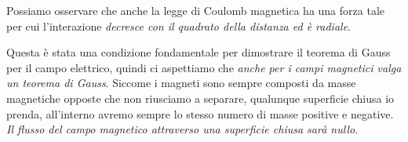 Possiamo osservare che anche la legge di Coulomb magnetica ha una forza tale per cui l'interazione \emph{decresce con il quadrato della distanza ed è radiale}.

Questa è stata una condizione fondamentale per dimostrare il teorema di Gauss per il campo elettrico, quindi ci aspettiamo che \emph{anche per i campi magnetici valga un teorema di Gauss}. Siccome i magneti sono sempre composti da masse magnetiche opposte che non riusciamo a separare, qualunque superficie chiusa io prenda, all'interno avremo sempre lo stesso numero di masse positive e negative. \emph{Il flusso del campo magnetico attraverso una superficie chiusa sarà nullo}.

\begin{figure}[htpb]
	\centering

	 
	\tikzset{
	pattern size/.store in=\mcSize, 
	pattern size = 5pt,
	pattern thickness/.store in=\mcThickness, 
	pattern thickness = 0.3pt,
	pattern radius/.store in=\mcRadius, 
	pattern radius = 1pt}
	\makeatletter
	\makeatother

	\begin{tikzpicture}[x=0.75pt,y=0.75pt,yscale=-1,xscale=1]


\end{tikzpicture}
\end{figure}
